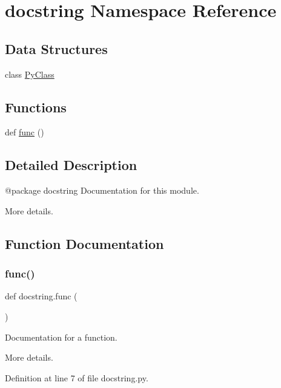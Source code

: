 \hypertarget{namespacedocstring}{}\section{docstring Namespace Reference}
\label{namespacedocstring}
\subsection*{Data Structures}
\begin{DoxyCompactItemize}
\item 
class \hyperlink{classdocstring_1_1_py_class}{Py\+Class}
\end{DoxyCompactItemize}
\subsection*{Functions}
\begin{DoxyCompactItemize}
\item 
def \hyperlink{namespacedocstring_aec1a168f6e16b33f87fe6a37b9208957}{func} ()
\end{DoxyCompactItemize}


\subsection{Detailed Description}
\begin{DoxyVerb}@package docstring
Documentation for this module.

More details.
\end{DoxyVerb}
 

\subsection{Function Documentation}
\mbox{\label{namespacedocstring_aec1a168f6e16b33f87fe6a37b9208957}} 
\subsubsection{\texorpdfstring{func()}{func()}}
{\footnotesize\ttfamily def docstring.\+func (\begin{DoxyParamCaption}{ }\end{DoxyParamCaption})}

\begin{DoxyVerb}Documentation for a function.

More details.
\end{DoxyVerb}
 

Definition at line 7 of file docstring.\+py.

